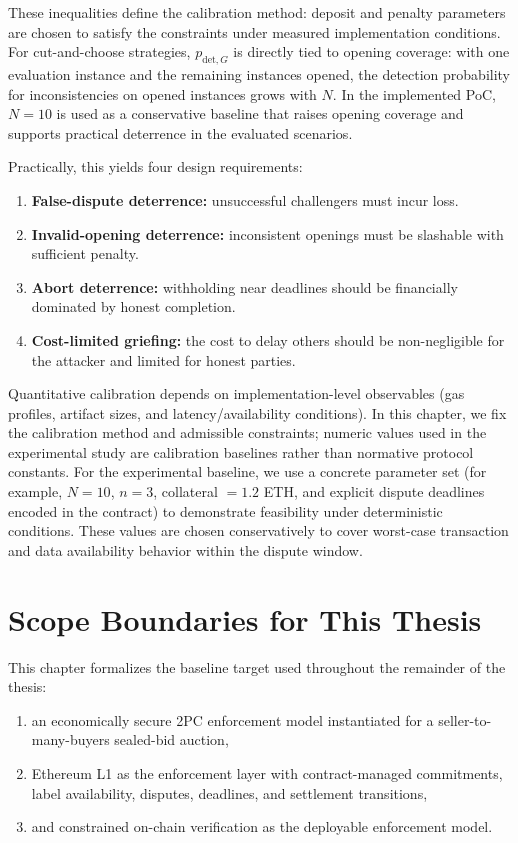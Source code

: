 \documentclass[final,twoside]{vutinfth}
\begin{document}
These inequalities define the calibration method: deposit and penalty
parameters are chosen to satisfy the constraints under measured implementation
conditions.
For cut-and-choose strategies, $p_{\mathrm{det},G}$ is directly tied to opening
coverage: with one evaluation instance and the remaining instances opened, the
detection probability for inconsistencies on opened instances grows with $N$.
In the implemented PoC, $N=10$ is used as a conservative baseline that raises
opening coverage and supports practical deterrence in the evaluated scenarios.

Practically, this yields four design requirements:
\begin{enumerate}
\item \textbf{False-dispute deterrence:} unsuccessful challengers must incur loss.
\item \textbf{Invalid-opening deterrence:} inconsistent openings must be slashable with sufficient penalty.
\item \textbf{Abort deterrence:} withholding near deadlines should be financially dominated by honest completion.
\item \textbf{Cost-limited griefing:} the cost to delay others should be non-negligible for the attacker and limited for honest parties.
\end{enumerate}

Quantitative calibration depends on implementation-level observables (gas
profiles, artifact sizes, and latency/availability conditions). In this chapter,
we fix the calibration method and admissible constraints; numeric values used in
the experimental study are calibration baselines rather than normative protocol
constants. For the experimental baseline, we use a concrete parameter set (for example,
$N=10$, $n=3$, collateral $=1.2$ ETH, and explicit dispute deadlines encoded in
the contract) to demonstrate feasibility under deterministic conditions. These
values are chosen conservatively to cover worst-case transaction and data
availability behavior within the dispute window.

\section{Scope Boundaries for This Thesis}
This chapter formalizes the baseline target used throughout the remainder of
the thesis:
\begin{enumerate}
\item an economically secure 2PC enforcement model instantiated for a seller-to-many-buyers sealed-bid auction,
\item Ethereum L1 as the enforcement layer with contract-managed commitments, label availability, disputes, deadlines, and settlement transitions,
\item and constrained on-chain verification as the deployable enforcement model.
\end{enumerate}
\end{document}
